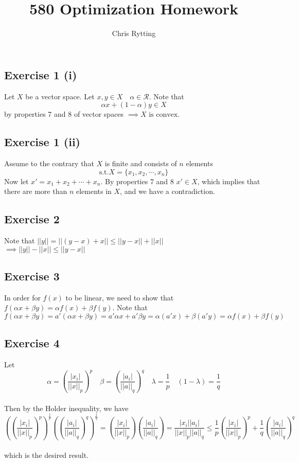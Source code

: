 \documentclass[letterpaper,12pt]{article}
\theoremstyle{definition}
\begin{document}
\title{580 Optimization Homework}
\author{Chris Rytting}
\maketitle

\subsection*{Exercise 1 (i)}
Let $X$ be a vector space. Let $x,y \in X \quad \alpha \in \mathscr{R} $. Note that 
\[\alpha x + (1-\alpha) y \in X\]
by properties 7 and 8 of vector spaces $\implies X \text{ is convex}$.

\subsection*{Exercise 1 (ii)}
Assume to the contrary that $X$ is finite and consists of $n$ elements
\[ \text{s.t.} X = \{x_1, x_2,\cdots,x_n\}\]
Now let $x' = x_1 + x_2 +\cdots + x_n$. By properties 7 and 8 $x' \in X$, which implies that there are more than $n$ elements in $X$, and we have a contradiction.

\subsection*{Exercise 2}
Note that 
$|| y || = ||(y-x) + x || \leq ||y-x|| + ||x||$\\
$\implies ||y|| - ||x|| \leq ||y-x||$

\subsection*{Exercise 3}
In order for $f(x)$ to be linear, we need to show that $f(\alpha x + \beta y) =\alpha f(x) + \beta f(y)$. Note that 
\[ f(\alpha x + \beta y) = a'(\alpha x + \beta y) = a'\alpha x + a'\beta y = \alpha (a' x) +\beta (a' y) = \alpha f(x) +\beta f(y)\]


\subsection*{Exercise 4}
Let 
\[\alpha= (\frac{|x_i|}{||x||_p})^p \quad \beta = (\frac{|a_i|}{||a||_q})^q \quad \lambda = \frac{1}{p} \quad (1-\lambda) = \frac{1}{q}\]
\\
Then by the Holder inequality, we have 
\\
\[((\frac{|x_i|}{||x||_p})^p)^\frac{1}{p} ((\frac{|a_i|}{||a||_q})^q)^\frac{1}{q} = (\frac{|x_i|}{||x||_p}) (\frac{|a_i|}{||a||_q}) = \frac{|x_i||a_i|}{||x||_p ||a||_q} \leq \frac{1}{p}(\frac{|x_i|}{||x||_p})^p + \frac{1}{q}(\frac{|a_i|}{||a||_q})^q\]
\\
which is the desired result.
\end{document}
